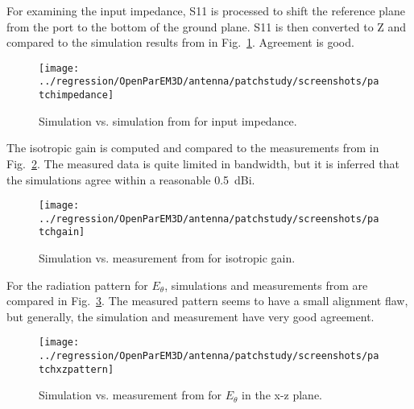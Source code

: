\documentclass[titlepage]{article}
\renewcommand\_{\textunderscore\linebreak[1]}
\begin{document}
For examining the input impedance, S11 is processed to shift the reference plane from the port to the bottom of the ground plane.  S11 is then converted to Z and compared to the simulation results from \cite{Mei} in Fig.~\ref{fig:patch_impedance}. Agreement is good.

\begin{figure}[H]
  \centering
  \texttt{[image: ../regression/OpenParEM3D/antenna/patch\_study/screenshots/patch\_impedance]}
  \caption{Simulation vs. simulation from \cite{Mei} for input impedance.}
  \label{fig:patch_impedance}
\end{figure}

The isotropic gain is computed and compared to the measurements from \cite{Mei} in Fig.~\ref{fig:patch_gain}.  The measured data is quite limited in bandwidth, but it is inferred that the simulations agree within a reasonable 0.5~dBi.

\begin{figure}[H]
  \centering
  \texttt{[image: ../regression/OpenParEM3D/antenna/patch\_study/screenshots/patch\_gain]}
  \caption{Simulation vs. measurement from \cite{Mei} for isotropic gain.}
  \label{fig:patch_gain}
\end{figure}

For the radiation pattern for $E_{\theta}$, simulations and measurements from \cite{Mei} are compared in Fig.~\ref{fig:patch_xz_pattern}.  The measured pattern seems to have a small alignment flaw, but generally, the simulation and measurement have very good agreement.

\begin{figure}[H]
  \centering
  \texttt{[image: ../regression/OpenParEM3D/antenna/patch\_study/screenshots/patch\_xz\_pattern]}
  \caption{Simulation vs. measurement from \cite{Mei} for $E_{\theta}$ in the x-z plane.}
  \label{fig:patch_xz_pattern}
\end{figure}
\end{document}
